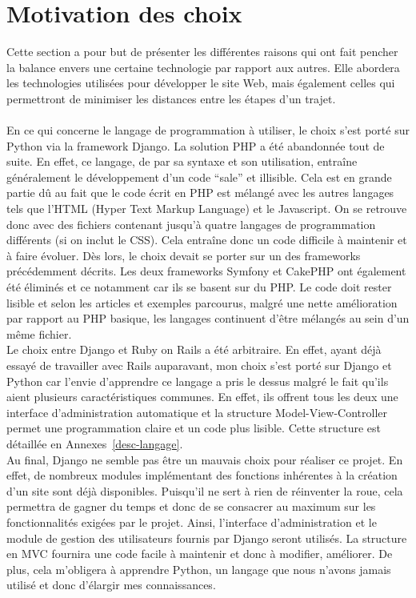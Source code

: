 \documentclass[12pt, a4paper, oneside]{article}
\begin{document}
\section{Motivation des choix}\label{choix}
    Cette section a pour but de présenter les différentes raisons qui ont fait pencher la balance envers une certaine technologie par rapport aux autres. Elle abordera les technologies utilisées pour développer le site Web, mais également celles qui permettront de minimiser les distances entre les étapes d'un trajet.\\\\
    \indent En ce qui concerne le langage de programmation à utiliser, le choix s'est porté sur Python via la framework Django. La solution PHP a été abandonnée tout de suite. En effet, ce langage, de par sa syntaxe et son utilisation, entraîne généralement le développement d'un code ``sale'' et illisible. Cela est en grande partie dû au fait que le code écrit en PHP est mélangé avec les autres langages tels que l'HTML (Hyper Text Markup Language) et le Javascript. On se retrouve donc avec des fichiers contenant jusqu'à quatre langages de programmation différents (si on inclut le CSS). Cela entraîne donc un code difficile à maintenir et à faire évoluer. Dès lors, le choix devait se porter sur un des frameworks précédemment décrits. Les deux frameworks Symfony et CakePHP ont également été éliminés et ce notamment car ils se basent sur du PHP. Le code doit rester lisible et selon les articles et exemples parcourus, malgré une nette amélioration par rapport au PHP basique, les langages continuent d'être mélangés au sein d'un même fichier.\\
    \indent Le choix entre Django et Ruby on Rails a été arbitraire. En effet, ayant déjà essayé de travailler avec Rails auparavant, mon choix s'est porté sur Django et Python car l'envie d'apprendre ce langage a pris le dessus malgré le fait qu'ils aient plusieurs caractéristiques communes. En effet, ils offrent tous les deux une interface d'administration automatique et la structure Model-View-Controller permet une programmation claire et un code plus lisible. Cette structure est détaillée en Annexes~\ref{desc-langage}.\\
    \indent Au final, Django ne semble pas être un mauvais choix pour réaliser ce projet. En effet, de nombreux modules implémentant des fonctions inhérentes à la création d'un site sont déjà disponibles. Puisqu'il ne sert à rien de réinventer la roue, cela permettra de gagner du temps et donc de se consacrer au maximum sur les fonctionnalités exigées par le projet. Ainsi, l'interface d'administration et le module de gestion des utilisateurs fournis par Django seront utilisés. La structure en MVC fournira une code facile à maintenir et donc à modifier, améliorer. De plus, cela m'obligera à apprendre Python, un langage que nous n'avons jamais utilisé et donc d'élargir mes connaissances.\\\\
\end{document}

